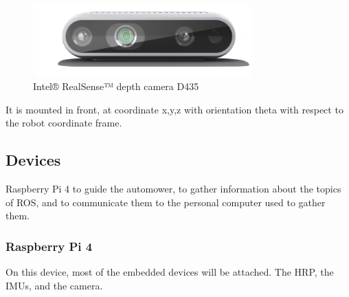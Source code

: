 \begin{figure}[!ht]
	\begin{center}
		\includegraphics[width=0.75\textwidth]{Images/4-Methods/d435i-1.png}
	\end{center}
	\caption{Intel® RealSense™ depth camera D435}
	\label{fig:d435}
\end{figure}

It is mounted in front, at coordinate x,y,z with orientation theta with respect to the robot coordinate frame.

\subsection{Devices}
\label{ssec:dev}
\noindent
Raspberry Pi 4 to guide the automower, to gather information about the topics of ROS, and to communicate them to the personal computer used to gather them.

\subsubsection{Raspberry Pi 4}
\noindent
On this device, most of the embedded devices will be attached.
The \gls{HRP}, the \glspl{IMU}, and the camera.

